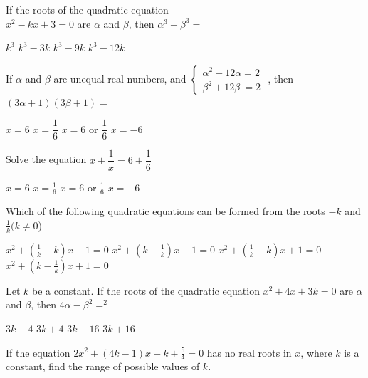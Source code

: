 \documentclass[addpoints, 10pt]{exam}
\begin{document}
\begin{questions}
\begin{multicols}{2}
		\begin{minipage}{0.9\linewidth}
			\question If the roots of the quadratic equation \\ $x^2-kx+3=0$ are $\alpha$ and $\beta$, then $\alpha^3+\beta^3=$

			\begin{choices}
				\choice $k^3$
				\choice	$k^3-3k$ 
				\choice $k^3-9k$
				\choice $k^3-12k$
			\end{choices}
		\end{minipage}

		\begin{minipage}{0.9\linewidth}
			\question If $\alpha$ and $\beta$ are unequal real numbers, and
			$
			\begin{cases}
				\alpha^2+12\alpha=2 \\
				\beta ^2 + 12 \beta \ = 2
			\end{cases}
			$
			, then $(3\alpha+1)(3\beta+1)=$

			\begin{choices}
				\choice $x=6$
				\choice $x=\dfrac{1}{6}$
				\choice $x=6 \text{ or } \dfrac{1}{6}$
				\choice $x=-6$
			\end{choices}
		\end{minipage}

		\begin{minipage}{0.9\linewidth}
			\question Solve the equation $x+\dfrac{1}{x} = 6+\dfrac{1}{6}$

			\begin{choices}
				\choice $x=6$
				\choice $x=\frac{1}{6}$
				\choice $x=6 \text{ or } \frac{1}{6}$
				\choice $x=-6$
			\end{choices}
		\end{minipage}

	
		\begin{minipage}{0.9\linewidth}
			\question Which of the following quadratic equations can be formed from the roots $-k$ and $\frac{1}{k} (k \neq 0$)
			\begin{choices}
				\choice $x^2+\left( \frac{1}{k}-k \right) x-1=0$	
				\choice $x^2+\left( k-\frac{1}{k} \right) x-1=0$	
				\choice $x^2+\left( \frac{1}{k}-k \right) x+1=0$	
				\choice $x^2+\left(k- \frac{1}{k} \right) x+1=0$	
			\end{choices}
		\end{minipage}

		\begin{minipage}{0.9\linewidth}
			\question Let $k$ be a constant. If the roots of the quadratic equation $x^2+4x+3k=0$ are $\alpha$ and $\beta$, then $4\alpha-\beta^2=^2$
			\begin{choices}
				\choice $3k-4$	
				\choice $3k+4$	
				\choice $3k-16$	
				\choice $3k+16$	
			\end{choices}
		\end{minipage}
	\end{multicols}
	\question If the equation $2x^2+(4k-1)x-k+\frac{5}{4}=0$ has no real roots in $x$, where $k$ is a constant, find the range of possible values of $k$.


\end{questions}
\end{document}
